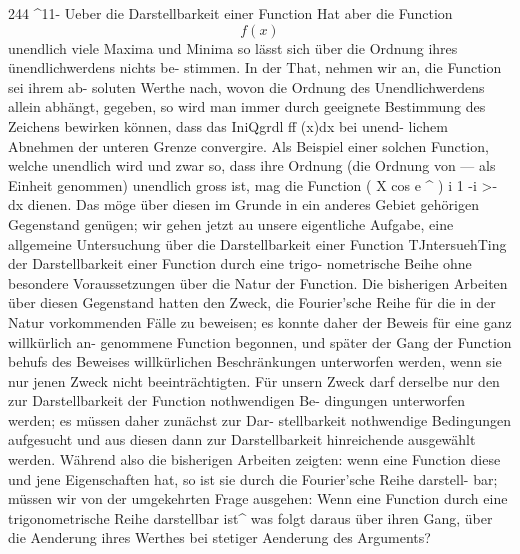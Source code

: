 \documentclass[11pt,a4paper]{article}
\begin{document}
{{{{%
244  ^11-    Ueber  die  Darstellbarkeit  einer  Function
Hat  aber  die  Function  $$f(x)$$  unendlich  viele  Maxima  und  Minima
so  lässt  sich  über  die  Ordnung  ihres  ünendlichwerdens  nichts  be-
stimmen. In  der  That,  nehmen  wir  an,  die  Function  sei  ihrem  ab-
soluten Werthe  nach,  wovon  die  Ordnung  des  Unendlichwerdens  allein
abhängt,  gegeben,  so  wird  man  immer  durch  geeignete  Bestimmung
des  Zeichens  bewirken  können,  dass  das  IniQgrdl  ff (x)dx  bei  unend-
lichem Abnehmen  der  unteren  Grenze  convergire.  Als  Beispiel  einer
solchen  Function,  welche  unendlich  wird  und  zwar  so,  dass  ihre  Ordnung
(die  Ordnung  von  ---  als  Einheit  genommen)  unendlich  gross  ist,  mag
die  Function
(  X  cos  e  ^  )
i         1     -i  >-
dx
dienen.
Das  möge  über  diesen  im  Grunde  in  ein  anderes  Gebiet  gehörigen
Gegenstand  genügen;  wir  gehen  jetzt  au  unsere  eigentliche  Aufgabe,
eine  allgemeine  Untersuchung  über  die  Darstellbarkeit  einer  Function
TJntersuehTing  der  Darstellbarkeit  einer  Function  durch  eine  trigo-
nometrische Beihe  ohne  besondere  Voraussetzungen  über  die  Natur
der  Function.
Die  bisherigen  Arbeiten  über  diesen  Gegenstand  hatten  den  Zweck,
die  Fourier'sche  Reihe  für  die  in  der  Natur  vorkommenden  Fälle  zu
beweisen;  es  konnte  daher  der  Beweis  für  eine  ganz  willkürlich  an-
genommene Function  begonnen,  und  später  der  Gang  der  Function  behufs
des  Beweises  willkürlichen  Beschränkungen  unterworfen  werden,  wenn
sie  nur  jenen  Zweck  nicht  beeinträchtigten.  Für  unsern  Zweck  darf
derselbe  nur  den  zur  Darstellbarkeit  der  Function  nothwendigen  Be-
dingungen unterworfen  werden;  es  müssen  daher  zunächst  zur  Dar-
stellbarkeit nothwendige  Bedingungen  aufgesucht  und  aus  diesen  dann
zur  Darstellbarkeit  hinreichende  ausgewählt  werden.  Während  also
die  bisherigen  Arbeiten  zeigten:  wenn  eine  Function  diese  und  jene
Eigenschaften  hat,  so  ist  sie  durch  die  Fourier'sche  Reihe  darstell-
bar; müssen  wir  von  der  umgekehrten  Frage  ausgehen:  Wenn  eine
Function  durch  eine  trigonometrische  Reihe  darstellbar  ist^  was  folgt
daraus  über  ihren  Gang,  über  die  Aenderung  ihres  Werthes  bei  stetiger
Aenderung  des  Arguments?
\newpage

}}}}
\end{document}

